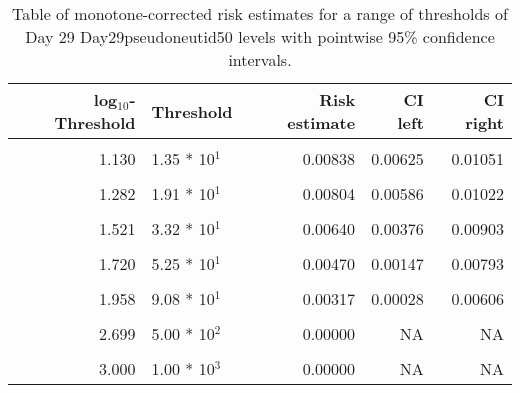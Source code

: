 \documentclass[]{article}
\begin{document}
\begin{table}[!h]

\caption{\label{tab:unnamed-chunk-41}Table of monotone-corrected risk estimates for a range of thresholds of Day 29 Day29pseudoneutid50 levels with pointwise 95\% confidence intervals.}
\centering
\begin{tabular}[t]{rlrrr}
\toprule
log$_{10}$-Threshold & Threshold & Risk estimate & CI left & CI right\\
\midrule
\cellcolor{gray!6}{0.083} & \cellcolor{gray!6}{1.21 * 10$^{0}$} & \cellcolor{gray!6}{0.00875} & \cellcolor{gray!6}{0.00673} & \cellcolor{gray!6}{0.01077}\\
1.130 & 1.35 * 10$^{1}$ & 0.00838 & 0.00625 & 0.01051\\
\cellcolor{gray!6}{1.204} & \cellcolor{gray!6}{1.60 * 10$^{1}$} & \cellcolor{gray!6}{0.00838} & \cellcolor{gray!6}{0.00622} & \cellcolor{gray!6}{0.01054}\\
1.282 & 1.91 * 10$^{1}$ & 0.00804 & 0.00586 & 0.01022\\
\cellcolor{gray!6}{1.423} & \cellcolor{gray!6}{2.65 * 10$^{1}$} & \cellcolor{gray!6}{0.00678} & \cellcolor{gray!6}{0.00460} & \cellcolor{gray!6}{0.00897}\\
1.521 & 3.32 * 10$^{1}$ & 0.00640 & 0.00376 & 0.00903\\
\cellcolor{gray!6}{1.613} & \cellcolor{gray!6}{4.10 * 10$^{1}$} & \cellcolor{gray!6}{0.00579} & \cellcolor{gray!6}{0.00277} & \cellcolor{gray!6}{0.00881}\\
1.720 & 5.25 * 10$^{1}$ & 0.00470 & 0.00147 & 0.00793\\
\cellcolor{gray!6}{1.891} & \cellcolor{gray!6}{7.78 * 10$^{1}$} & \cellcolor{gray!6}{0.00403} & \cellcolor{gray!6}{0.00043} & \cellcolor{gray!6}{0.00763}\\
1.958 & 9.08 * 10$^{1}$ & 0.00317 & 0.00028 & 0.00606\\
\cellcolor{gray!6}{2.047} & \cellcolor{gray!6}{1.11 * 10$^{2}$} & \cellcolor{gray!6}{0.00287} & \cellcolor{gray!6}{0.00061} & \cellcolor{gray!6}{0.00513}\\
2.699 & 5.00 * 10$^{2}$ & 0.00000 & NA & NA\\
\cellcolor{gray!6}{2.828} & \cellcolor{gray!6}{6.73 * 10$^{2}$} & \cellcolor{gray!6}{0.00000} & \cellcolor{gray!6}{NA} & \cellcolor{gray!6}{NA}\\
3.000 & 1.00 * 10$^{3}$ & 0.00000 & NA & NA\\
\bottomrule
\end{tabular}
\end{table}
\end{document}

